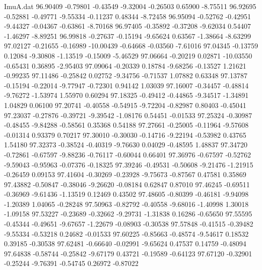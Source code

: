 \begin{filecontents}{ImuA.dat}
  96.90409   -0.79801   -0.43549   -9.32004   -0.26503    0.65900   -8.75511
  96.92695   -0.52881   -0.49771   -9.55334   -0.11237    0.48344   -8.72458
  96.95094   -0.52762   -0.42951   -9.44327   -0.04367   -0.63861   -8.70168
  96.97405   -0.35892   -0.37208   -9.62034    0.54407   -1.46297   -8.89251
  96.99818   -0.27637   -0.15194   -9.65624    0.63567   -1.38664   -8.63299
  97.02127   -0.21655   -0.16989  -10.00439   -0.64668   -0.03560   -7.61016
  97.04345   -0.13759    0.12084   -9.30808   -1.13519   -0.15009   -5.46529
  97.06664   -0.20219    0.02871  -10.03550   -0.65431    0.36895   -2.95403
  97.09064   -0.20339    0.18784   -9.68256   -0.13527    1.21621   -0.99235
  97.11486   -0.25842    0.02752   -9.34756   -0.71537    1.07882    0.63348
  97.13787   -0.15194   -0.22014   -9.77947   -0.72301    0.94142    1.03039
  97.16007   -0.34457   -0.48814   -9.76272   -1.53974    1.55970    0.60294
  97.18325   -0.49412   -0.44865   -9.34517   -1.34891    1.04829    0.06100
  97.20741   -0.40558   -0.54915   -9.72204   -0.82987    0.80403   -0.45041
  97.23037   -0.27876   -0.39721   -9.39542   -1.08176    0.54451   -0.01533
  97.25324   -0.30987   -0.48455   -9.84288   -0.58561    0.35368    0.54188
  97.27661   -0.25005   -0.11964   -9.57608   -0.01314    0.93379    0.70217
  97.30010   -0.30030   -0.14716   -9.22194   -0.53982    0.43765    1.54180
  97.32373   -0.38524   -0.40319   -9.76630    0.04029   -0.48595    1.48837
  97.34720   -0.72861   -0.67597   -9.88236   -0.76117   -0.60044    0.66401
  97.36976   -0.67597   -0.52762   -9.59043   -0.95963   -0.07376   -0.18325
  97.39246   -0.49531   -0.50608   -9.21476   -1.21915   -0.26459    0.09153
  97.41604   -0.30269   -0.23928   -9.75673   -0.87567    0.47581    0.35869
  97.43882   -0.50847   -0.38046   -9.26620   -0.08184    0.62847    0.87010
  97.46245   -0.69511   -0.36969   -9.61436   -1.13519    0.12469    0.43502
  97.48605   -0.80399   -0.46181   -9.94098   -1.20389    1.04065   -0.28248
  97.50963   -0.82792   -0.40558   -9.68016   -1.40998    1.30018   -1.09158
  97.53227   -0.23689   -0.32662   -9.29731   -1.31838    0.16286   -0.65650
  97.55595   -0.45344   -0.49651   -9.67657   -1.22679   -0.08903   -0.30538
  97.57848   -0.41515   -0.39482   -9.55334   -0.53218    0.24682   -0.01533
  97.60225   -0.85663   -0.48574   -9.54617    0.18532    0.39185   -0.30538
  97.62481   -0.66640   -0.02991   -9.65624    0.47537    0.14759   -0.48094
  97.64838   -0.58744   -0.25842   -9.67179    0.43721   -0.19589   -0.64123
  97.67120   -0.32901   -0.25244   -9.76391   -0.54745    0.26972   -0.87022

\end{filecontents}
